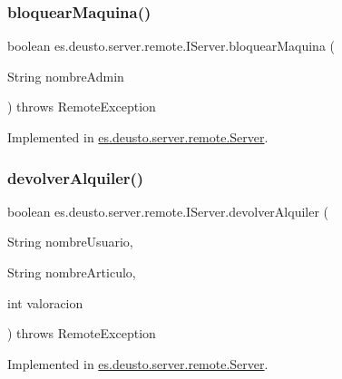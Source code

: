 \subsubsection{\texorpdfstring{bloquearMaquina()}{bloquearMaquina()}}
{\footnotesize\ttfamily boolean es.\+deusto.\+server.\+remote.\+I\+Server.\+bloquear\+Maquina (\begin{DoxyParamCaption}\item[{String}]{nombre\+Admin }\end{DoxyParamCaption}) throws Remote\+Exception}



Implemented in \mbox{\hyperlink{classes_1_1deusto_1_1server_1_1remote_1_1_server_ae03d92a9f36e32fe68553bfc8506efec}{es.\+deusto.\+server.\+remote.\+Server}}.

\mbox{\label{interfacees_1_1deusto_1_1server_1_1remote_1_1_i_server_a145e3b64f34bedd019267417d8efcc64}} 
\subsubsection{\texorpdfstring{devolverAlquiler()}{devolverAlquiler()}}
{\footnotesize\ttfamily boolean es.\+deusto.\+server.\+remote.\+I\+Server.\+devolver\+Alquiler (\begin{DoxyParamCaption}\item[{String}]{nombre\+Usuario,  }\item[{String}]{nombre\+Articulo,  }\item[{int}]{valoracion }\end{DoxyParamCaption}) throws Remote\+Exception}



Implemented in \mbox{\hyperlink{classes_1_1deusto_1_1server_1_1remote_1_1_server_a980cae19c411c05bc1d1b9ec93e0083a}{es.\+deusto.\+server.\+remote.\+Server}}.

\mbox{\label{interfacees_1_1deusto_1_1server_1_1remote_1_1_i_server_a9c3a20fd809291100bd8c3259a857d2b}} 
